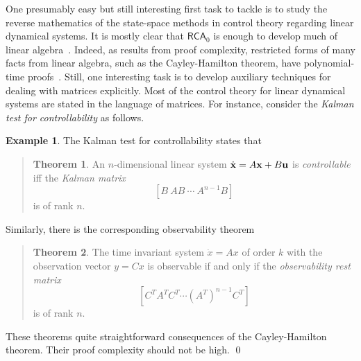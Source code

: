 \documentclass[10pt]{article}
\theoremstyle{definition}
\newtheorem{example}{Example}[section]
\newtheorem{theorem}{Theorem}[section]
\begin{document}
One presumably easy but still interesting first task to tackle is to study the reverse mathematics of the state-space methods in control theory regarding linear dynamical systems. It is mostly clear that $\mathsf{RCA}_0$ is enough to develop much of linear algebra~\cite{Simpson}. Indeed, as results from proof complexity, restricted forms of many facts from linear algebra, such as the Cayley-Hamilton theorem, have polynomial-time proofs~\cite{cookbook}. Still, one interesting task is to develop auxiliary techniques for dealing with matrices explicitly. Most of the control theory for linear dynamical systems are stated in the language of matrices. 
For instance, consider the {\em Kalman test for controllability} as follows. 
\begin{example} The Kalman test for controllability states that 
\begin{quote}
\vspace{-.5cm}
\begin{theorem}An $n$-dimensional linear system $\dot {\bf x} = A{\bf x}+B{\bf u}$ is {\em controllable} iff the {\em Kalman matrix}
$$[B\ AB\ \cdots\ A^{n-1}B]$$
is of rank $n$.
\end{theorem} 
\end{quote}
Similarly, there is the corresponding observability theorem
\begin{quote}
\vspace{-.5cm}
\begin{theorem}
The time invariant system $\dot{x} = Ax$ of order $k$ with the observation vector $y=Cx$ is observable if and only if the {\em observability rest matrix}
$$[C^T A^TC^T \cdots (A^T)^{n-1}C^T]$$
is of rank $n$. 
\end{theorem}
\end{quote}
These theorems quite straightforward consequences of the Cayley-Hamilton theorem. Their proof complexity should not be high. \qed
\end{example}
\end{document}
